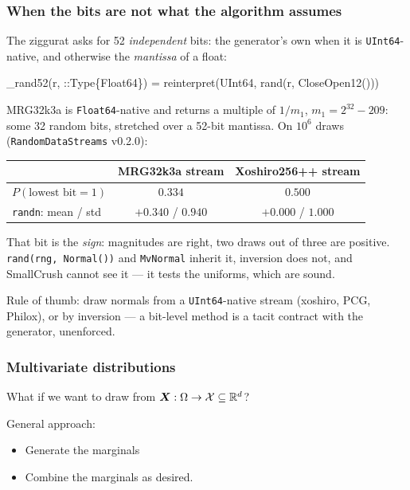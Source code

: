 \documentclass[aspectratio=169]{beamer}
\def\blue{\color{blue}}
\def\red{\color{red}}
\begin{document}
\begin{frame}[fragile]
\frametitle{When the bits are not what the algorithm assumes}

The ziggurat asks for 52 \emph{independent} bits: the generator's own when it is
\texttt{UInt64}-native, and otherwise the \emph{mantissa} of a float:

\begin{footnotesize}
\begin{semiverbatim}
_rand52(r, ::Type\{Float64\}) = reinterpret(UInt64, rand(r, CloseOpen12()))
\end{semiverbatim}
\end{footnotesize}

\vspace{-0.1cm}
MRG32k3a is \texttt{Float64}-native and returns a multiple of $1/m_1$, $m_1 = 2^{32}-209$: some 32
random bits, stretched over a 52-bit mantissa. On $10^6$ draws (\texttt{RandomDataStreams} v0.2.0):

\begin{center}
\begin{footnotesize}
\begin{tabular}{lcc}
\hline
 & MRG32k3a stream & Xoshiro256++ stream \\
\hline
$P(\mbox{lowest bit} = 1)$ & {\red $0.334$} & $0.500$ \\
\texttt{randn}: mean / std & {\red $+0.340$ / $0.940$} & $+0.000$ / $1.000$ \\
\hline
\end{tabular}
\end{footnotesize}
\end{center}

That bit is the \emph{sign}: magnitudes are right, two draws out of three are positive.
\texttt{rand(rng, Normal())} and \texttt{MvNormal} inherit it, inversion does not, and SmallCrush
cannot see it --- it tests the uniforms, which are sound.

{\blue Rule of thumb}: draw normals from a \texttt{UInt64}-native stream (xoshiro, PCG, Philox), or
by inversion --- a bit-level method is a tacit contract with the generator, unenforced.

\end{frame}

\begin{frame}
\frametitle{Multivariate distributions}

What if we want to draw from ${\boldsymbol{X}}: \Omega \rightarrow {\mathcal{X}} \subseteq {\mathbb{R}}^d$?

General approach:
\begin{itemize}
	\item Generate the marginals
	\item Combine the marginals as desired.
\end{itemize}
		
\end{frame}
\end{document}
